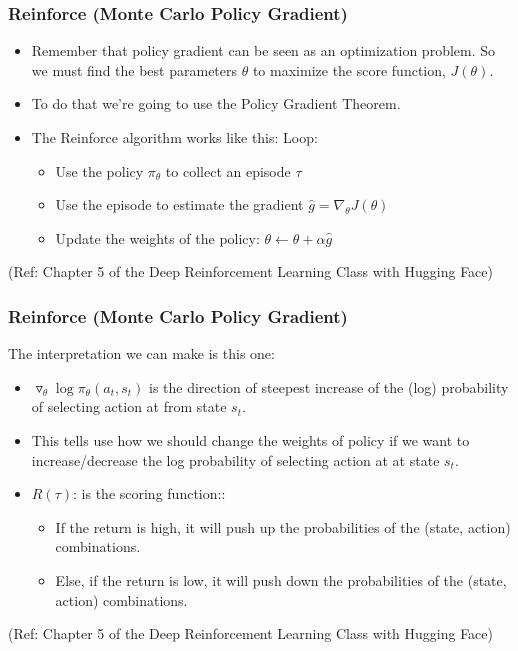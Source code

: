 \begin{frame}[fragile]\frametitle{Reinforce (Monte Carlo Policy Gradient)}

\begin{itemize}
\item Remember that policy gradient can be seen as an optimization problem. So we must find the best parameters $\theta$ to maximize the score function, $J(\theta)$.

\item To do that we're going to use the Policy Gradient Theorem. 
\item The Reinforce algorithm works like this: Loop:
\begin{itemize}
\item Use the policy $\pi_\theta$ to collect an episode $\tau$
\item Use the episode to estimate the gradient $\hat{g} = \nabla_\theta J(\theta)$ 
\item Update the weights of the policy: $\theta \leftarrow \theta + \alpha \hat{g}$
\end{itemize}
\end{itemize}

{\tiny (Ref: Chapter 5 of the Deep Reinforcement Learning Class with Hugging Face)}

\end{frame}



\begin{frame}[fragile]\frametitle{Reinforce (Monte Carlo Policy Gradient)}

The interpretation we can make is this one:

\begin{itemize}
\item $\triangledown_\theta \log\pi_\theta(a_t,s_t)$  is the direction of steepest increase of the (log) probability of selecting action at from state  $s_t$. 
\item This tells use how we should change the weights of policy if we want to increase/decrease the log probability of selecting action at at state $s_t$.
\item $R(\tau)$: is the scoring function::
\begin{itemize}
\item If the return is high, it will push up the probabilities of the (state, action) combinations.
\item Else, if the return is low, it will push down the probabilities of the (state, action) combinations.
\end{itemize}
\end{itemize}

{\tiny (Ref: Chapter 5 of the Deep Reinforcement Learning Class with Hugging Face)}

\end{frame}


